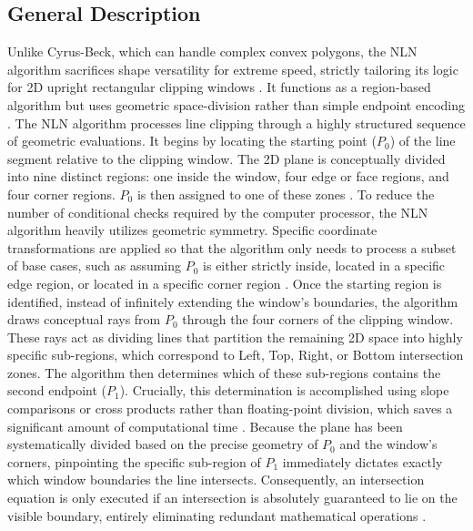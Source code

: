 \subsection{General Description}
Unlike Cyrus-Beck, which can handle complex convex polygons, the NLN algorithm sacrifices shape versatility for extreme speed, strictly tailoring its logic for 2D upright rectangular clipping windows \cite{MatthesDrakopoulos2022}. It functions as a region-based algorithm but uses geometric space-division rather than simple endpoint encoding \cite{NichollLeeNicholl1987}.
The NLN algorithm processes line clipping through a highly structured sequence of geometric evaluations. It begins by locating the starting point ($P_0$) of the line segment relative to the clipping window. The 2D plane is conceptually divided into nine distinct regions: one inside the window, four edge or face regions, and four corner regions. $P_0$ is then assigned to one of these zones \cite{NichollLeeNicholl1987}. To reduce the number of conditional checks required by the computer processor, the NLN algorithm heavily utilizes geometric symmetry. Specific coordinate transformations are applied so that the algorithm only needs to process a subset of base cases, such as assuming $P_0$ is either strictly inside, located in a specific edge region, or located in a specific corner region \cite{NichollLeeNicholl1987}.
Once the starting region is identified, instead of infinitely extending the window's boundaries, the algorithm draws conceptual rays from $P_0$ through the four corners of the clipping window. These rays act as dividing lines that partition the remaining 2D space into highly specific sub-regions, which correspond to Left, Top, Right, or Bottom intersection zones. The algorithm then determines which of these sub-regions contains the second endpoint ($P_1$). Crucially, this determination is accomplished using slope comparisons or cross products rather than floating-point division, which saves a significant amount of computational time \cite{NichollLeeNicholl1987, MatthesDrakopoulos2022}. Because the plane has been systematically divided based on the precise geometry of $P_0$ and the window's corners, pinpointing the specific sub-region of $P_1$ immediately dictates exactly which window boundaries the line intersects. Consequently, an intersection equation is only executed if an intersection is absolutely guaranteed to lie on the visible boundary, entirely eliminating redundant mathematical operations \cite{MatthesDrakopoulos2022}.